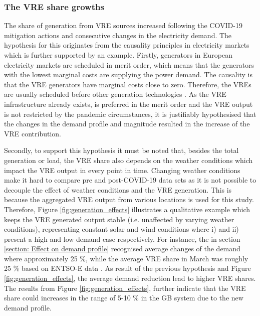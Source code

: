 \documentclass[energies,article,submit,moreauthors,pdftex]{Definitions/mdpi}
\begin{document}
\subsubsection{The VRE share growths}
The share of generation from VRE sources increased following the COVID-19 mitigation actions and consecutive changes in the electricity demand. The hypothesis for this originates from the causality principles in electricity markets which is further supported by an example. 
Firstly, generators in European electricity markets are scheduled in merit order, which means that the generators with the lowest marginal costs are supplying the power demand. The causality is that the VRE generators have marginal costs close to zero. Therefore, the VREs are usually scheduled before other generation technologies \cite{Winkler2016ImpactMatter}. As the VRE infrastructure already exists, is preferred in the merit order and the VRE output is not restricted by the pandemic circumstances, it is justifiably hypothesised that the changes in the demand profile and magnitude resulted in the increase of the VRE contribution. 

Secondly, to support this hypothesis it must be noted that, besides the total generation or load, the VRE share also depends on the weather conditions which impact the VRE output in every point in time. Changing weather conditions make it hard to compare pre and post-COVID-19 data sets as it is not possible to decouple the effect of weather conditions and the VRE generation. This is because the aggregated VRE output from various locations is used for this study. Therefore, Figure \ref{fig:generation_effects} illustrates a qualitative example which keeps the VRE generated output stable (i.e. unaffected by varying weather conditions), representing constant solar and wind conditions where i) and ii) present a high and low demand case respectively. 
For instance, the in section \ref{section: Effect on demand profile} recognised average changes of the demand where approximately 25 \%, while the average VRE share in March was roughly 25 \% based on ENTSO-E data \cite{ENTSO-E2020ENTSO-EPlatform}. %
As result of the previous hypothesis and Figure \ref{fig:generation_effects}, the average demand reduction lead to higher VRE shares. The results from Figure \ref{fig:generation_effects}, further indicate that the VRE share could increases in the range of 5-10 \% in the GB system due to the new demand profile.
\end{document}
